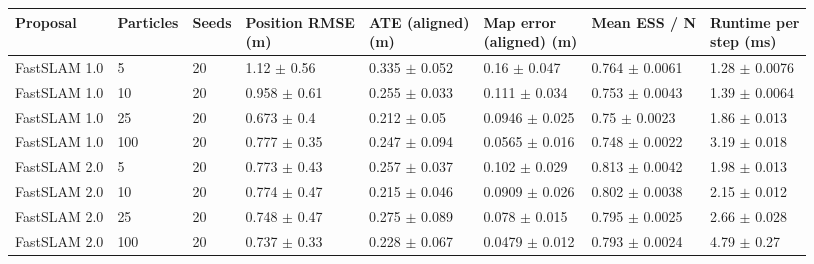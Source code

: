 \begin{tabular}{llllllll}
\toprule
Proposal & Particles & Seeds & \shortstack[l]{Position RMSE\\(m)} & \shortstack[l]{ATE (aligned)\\(m)} & \shortstack[l]{Map error\\(aligned) (m)} & Mean ESS / N & \shortstack[l]{Runtime per\\step (ms)} \\
\midrule
FastSLAM 1.0 & 5 & 20 & 1.12 $\pm$ 0.56 & 0.335 $\pm$ 0.052 & 0.16 $\pm$ 0.047 & 0.764 $\pm$ 0.0061 & 1.28 $\pm$ 0.0076 \\
FastSLAM 1.0 & 10 & 20 & 0.958 $\pm$ 0.61 & 0.255 $\pm$ 0.033 & 0.111 $\pm$ 0.034 & 0.753 $\pm$ 0.0043 & 1.39 $\pm$ 0.0064 \\
FastSLAM 1.0 & 25 & 20 & 0.673 $\pm$ 0.4 & 0.212 $\pm$ 0.05 & 0.0946 $\pm$ 0.025 & 0.75 $\pm$ 0.0023 & 1.86 $\pm$ 0.013 \\
FastSLAM 1.0 & 100 & 20 & 0.777 $\pm$ 0.35 & 0.247 $\pm$ 0.094 & 0.0565 $\pm$ 0.016 & 0.748 $\pm$ 0.0022 & 3.19 $\pm$ 0.018 \\
FastSLAM 2.0 & 5 & 20 & 0.773 $\pm$ 0.43 & 0.257 $\pm$ 0.037 & 0.102 $\pm$ 0.029 & 0.813 $\pm$ 0.0042 & 1.98 $\pm$ 0.013 \\
FastSLAM 2.0 & 10 & 20 & 0.774 $\pm$ 0.47 & 0.215 $\pm$ 0.046 & 0.0909 $\pm$ 0.026 & 0.802 $\pm$ 0.0038 & 2.15 $\pm$ 0.012 \\
FastSLAM 2.0 & 25 & 20 & 0.748 $\pm$ 0.47 & 0.275 $\pm$ 0.089 & 0.078 $\pm$ 0.015 & 0.795 $\pm$ 0.0025 & 2.66 $\pm$ 0.028 \\
FastSLAM 2.0 & 100 & 20 & 0.737 $\pm$ 0.33 & 0.228 $\pm$ 0.067 & 0.0479 $\pm$ 0.012 & 0.793 $\pm$ 0.0024 & 4.79 $\pm$ 0.27 \\
\bottomrule
\end{tabular}
